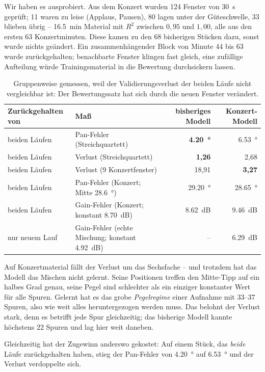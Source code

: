 \documentclass[11pt,a4paper]{article}
\begin{document}
Wir haben es ausprobiert. Aus dem Konzert wurden \num{124} Fenster von
\SI{30}{s} geprüft; \num{11} waren zu leise (Applaus, Pausen), \num{80} lagen
unter der Güteschwelle, \num{33} blieben übrig -- \SI{16.5}{min} Material mit
$R^2$ zwischen $0{,}95$ und $1{,}00$, alle aus den ersten 63 Konzertminuten.
Diese kamen zu den 68 bisherigen Stücken dazu, sonst wurde nichts geändert.
Ein zusammenhängender Block von Minute 44 bis 63 wurde zurückgehalten;
benachbarte Fenster klingen fast gleich, eine zufällige Aufteilung würde
Trainingsmaterial in die Bewertung durchsickern lassen.

\begin{table}[h]
\centering\small
\begin{tabular}{@{}llrr@{}}
\toprule
Zurückgehalten von & Maß & bisheriges Modell & Konzert-Modell \\
\midrule
beiden Läufen & Pan-Fehler (Streichquartett) & \textbf{\SI{4.20}{\degree}} & \SI{6.53}{\degree} \\
beiden Läufen & Verlust (Streichquartett) & \textbf{1,26} & 2,68 \\
beiden Läufen & Verlust (9 Konzertfenster) & 18,91 & \textbf{3,27} \\
beiden Läufen & Pan-Fehler (Konzert; Mitte \SI{28.6}{\degree}) & \SI{29.20}{\degree} & \SI{28.65}{\degree} \\
beiden Läufen & Gain-Fehler (Konzert; konstant \SI{8.70}{dB}) & \SI{8.62}{dB} & \SI{9.46}{dB} \\
nur neuem Lauf & Gain-Fehler (echte Mischung; konstant \SI{4.92}{dB}) & -- & \SI{6.29}{dB} \\
\bottomrule
\end{tabular}
\caption{Gruppenweise gemessen, weil der Validierungsverlust der beiden Läufe
nicht vergleichbar ist: Der Bewertungssatz hat sich durch die neuen Fenster
verändert.}
\end{table}

Auf Konzertmaterial fällt der Verlust um das Sechsfache -- und trotzdem hat das
Modell das Mischen nicht gelernt. Seine Positionen treffen den Mitte-Tipp auf
ein halbes Grad genau, seine Pegel sind schlechter als ein einziger konstanter
Wert für alle Spuren. Gelernt hat es das grobe \emph{Pegelregime} einer
Aufnahme mit 33--37 Spuren, also wie weit alles heruntergezogen werden muss.
Das belohnt der Verlust stark, denn es betrifft jede Spur gleichzeitig; das
bisherige Modell kannte höchstens 22 Spuren und lag hier weit daneben.

Gleichzeitig hat der Zugewinn anderswo gekostet: Auf einem Stück, das
\emph{beide} Läufe zurückgehalten haben, stieg der Pan-Fehler von
\SI{4.20}{\degree} auf \SI{6.53}{\degree} und der Verlust verdoppelte sich.
\end{document}
